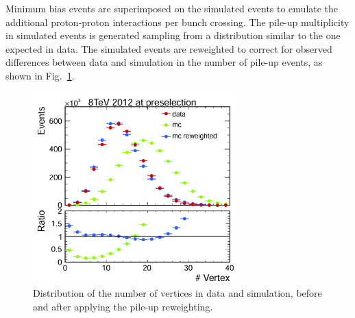 Minimum bias events are superimposed on the simulated events to emulate the additional 
proton-proton interactions per bunch crossing. The pile-up multiplicity in simulated events is generated sampling from a distribution similar to the one expected in data.
The simulated events are reweighted to correct for observed differences between data and simulation in the number of pile-up events, as shown in Fig.~\ref{fig:nvertices}.

\begin{figure}[htb]
\centering
\includegraphics[width=0.7\textwidth]{images/nvertex.pdf}
\caption{Distribution of the number of vertices in data and simulation, before and after applying the pile-up reweighting.}\label{fig:nvertices}
\end{figure}

